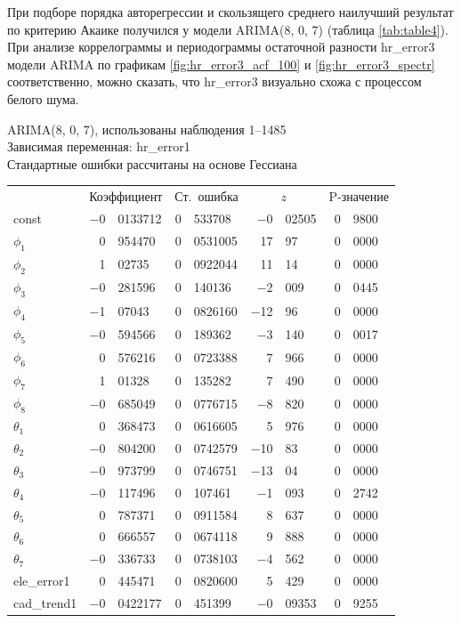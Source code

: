 \documentclass[a4paper,12pt]{article}
\begin{document}
При подборе порядка авторегрессии и скользящего среднего наилучший результат по критерию Акаике получился у модели ARIMA(8, 0, 7) (таблица \ref{tab:table4}). При анализе коррелограммы и периодограммы остаточной разности hr\_error3 модели ARIMA по графикам \ref{fig:hr_error3_acf_100} и \ref{fig:hr_error3_spectr} соответственно, можно сказать, что hr\_error3 визуально схожа с процессом белого шума.

\begin{table}[H]
\begin{center}
	
	ARIMA(8, 0, 7), использованы наблюдения 1--1485\\
	Зависимая переменная: hr\_error1\\
	Стандартные ошибки рассчитаны на основе Гессиана
	
	\vspace{1em}
	
	\begin{tabular}{lr@{,}lr@{,}lr@{,}lr@{,}l}
		&
		\multicolumn{2}{c}{Коэффициент} &
		\multicolumn{2}{c}{Ст.\ ошибка} &
		\multicolumn{2}{c}{$z$} &
		\multicolumn{2}{c}{P-значение} \\[1ex]
		const &
		$-$0&0133712 &
		0&533708 &
		$-$0&02505 &
		0&9800 \\
		$\phi_{1}$ &
		0&954470 &
		0&0531005 &
		17&97 &
		0&0000 \\
		$\phi_{2}$ &
		1&02735 &
		0&0922044 &
		11&14 &
		0&0000 \\
		$\phi_{3}$ &
		$-$0&281596 &
		0&140136 &
		$-$2&009 &
		0&0445 \\
		$\phi_{4}$ &
		$-$1&07043 &
		0&0826160 &
		$-$12&96 &
		0&0000 \\
		$\phi_{5}$ &
		$-$0&594566 &
		0&189362 &
		$-$3&140 &
		0&0017 \\
		$\phi_{6}$ &
		0&576216 &
		0&0723388 &
		7&966 &
		0&0000 \\
		$\phi_{7}$ &
		1&01328 &
		0&135282 &
		7&490 &
		0&0000 \\
		$\phi_{8}$ &
		$-$0&685049 &
		0&0776715 &
		$-$8&820 &
		0&0000 \\
		$\theta_{1}$ &
		0&368473 &
		0&0616605 &
		5&976 &
		0&0000 \\
		$\theta_{2}$ &
		$-$0&804200 &
		0&0742579 &
		$-$10&83 &
		0&0000 \\
		$\theta_{3}$ &
		$-$0&973799 &
		0&0746751 &
		$-$13&04 &
		0&0000 \\
		$\theta_{4}$ &
		$-$0&117496 &
		0&107461 &
		$-$1&093 &
		0&2742 \\
		$\theta_{5}$ &
		0&787371 &
		0&0911584 &
		8&637 &
		0&0000 \\
		$\theta_{6}$ &
		0&666557 &
		0&0674118 &
		9&888 &
		0&0000 \\
		$\theta_{7}$ &
		$-$0&336733 &
		0&0738103 &
		$-$4&562 &
		0&0000 \\
		ele\_error1 &
		0&445471 &
		0&0820600 &
		5&429 &
		0&0000 \\
		cad\_trend1 &
		$-$0&0422177 &
		0&451399 &
		$-$0&09353 &
		0&9255 \\
	\end{tabular}
	

\end{center}
\end{table}
\end{document}
